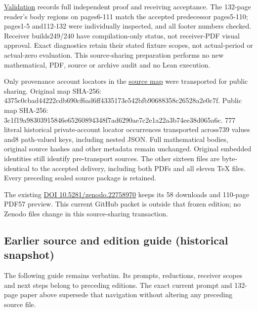 \documentclass[
]{article}
\begin{document}
\href{https://github.com/KokunoYumeto/zeta-function-research-reader/blob/main/workbenches/splitzero-tandem/continuations/20260915-quotient-moment-continuation/12_VALIDATION.md}{Validation}
records full independent proof and receiving acceptance. The 132-page
reader's body regions on pages6-111 match the accepted predecessor
pages5-110; pages1-5 and112-132 were individually inspected, and all
footer numbers checked. Receiver builds249/240 have compilation-only
status, not receiver-PDF visual approval. Exact diagnostics retain their
stated fixture scopes, not actual-period or actual-zero evaluation. This
source-sharing preparation performs no new mathematical, PDF, source or
archive audit and no Lean execution.

Only provenance account locators in the
\href{https://github.com/KokunoYumeto/zeta-function-research-reader/blob/main/workbenches/splitzero-tandem/continuations/20260915-quotient-moment-continuation/11_SOURCE_MAP.json}{source
map} were transported for public sharing. Original map SHA-256:
4375c0cbad44222cdb690cf6ad6ff4335173e542bfb90688358c26528a2e0c7f. Public
map SHA-256:
3c1f19a98303915846e65260894348f7ad6290ae7c2e1a22a3b74ee38d065a6c. 777
literal historical private-account locator occurrences transported
across739 values and8 path-valued keys, including nested JSON. Full
mathematical bodies, original source hashes and other metadata remain
unchanged. Original embedded identities still identify pre-transport
sources. The other sixteen files are byte-identical to the accepted
delivery, including both PDFs and all eleven TeX files. Every preceding
sealed source package is retained.

The existing \href{https://doi.org/10.5281/zenodo.22758970}{DOI
10.5281/zenodo.22758970} keeps its 58 downloads and 110-page PDF57
preview. This current GitHub packet is outside that frozen edition; no
Zenodo files change in this source-sharing transaction.

\subsection{Earlier source and edition guide (historical
snapshot)}\label{earlier-source-and-edition-guide-historical-snapshot-9}

The following guide remains verbatim. Its prompts, reductions, receiver
scopes and next steps belong to preceding editions. The exact current
prompt and 132-page paper above supersede that navigation without
altering any preceding source file.
\end{document}
